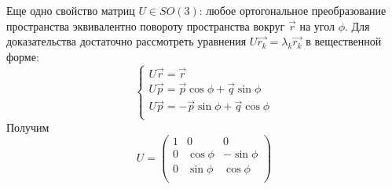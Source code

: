 Еще одно свойство матриц $U\in SO(3)$: любое ортогональное преобразование пространства эквивалентно повороту пространства вокруг $\vec{r}$ на угол $\phi$. Для доказательства достаточно рассмотреть уравнения $U\vec{r_k} = \lambda_k\vec{r_k}$ в вещественной форме:
\[
\begin{cases}
    U\vec{r} = \vec{r}\\
    U\vec{p} = \vec{p}\cos{\phi} + \vec{q}\sin{\phi}\\
    U\vec{p} = -\vec{p}\sin{\phi} + \vec{q}\cos{\phi}\\
\end{cases}
\]
Получим
\[
U = \begin{pmatrix}
    1 & 0 & 0\\
    0 & \cos{\phi} & -\sin{\phi}\\
    0 & \sin{\phi} & \cos{\phi}\\
\end{pmatrix}
\]
